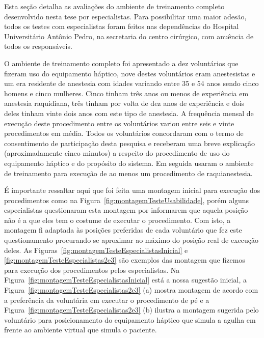Esta seção detalha as avaliações do ambiente de treinamento completo desenvolvido nesta tese por especialistas. Para possibilitar uma maior adesão, todos os testes com especialistas foram feitos nas dependências do Hospital Universitário Antônio Pedro, na secretaria do centro cirúrgico, com anuência de todos os responsáveis.

O ambiente de treinamento completo foi apresentado a dez voluntários que fizeram uso do equipamento háptico, nove destes voluntários eram anestesistas e um era residente de anestesia com idades variando entre 35 e 54 anos sendo cinco homens e cinco mulheres. Cinco tinham três anos ou menos de experiência em anestesia raquidiana, três tinham por volta de dez anos de experiência e dois deles tinham vinte dois anos com este tipo de anestesia. A frequência mensal de execução deste procedimento entre os voluntários variou entre seis e vinte procedimentos em média. Todos os voluntários concordaram com o termo de consentimento de participação desta pesquisa e receberam uma breve explicação (aproximadamente cinco minutos) a respeito do procedimento de uso do equipamento háptico e do propósito do sistema. Em seguida usaram o ambiente de treinamento para execução de ao menos um procedimento de raquianestesia. 

É importante ressaltar aqui que foi feita uma montagem inicial para execução dos procedimentos como na Figura~\ref{fig:montagemTesteUsabilidade}, porém alguns especialistas questionaram esta montagem por informarem que aquela posição não é a que eles tem o costume de executar o procedimento. Com isto, a montagem fi adaptada às posições preferidas de cada voluntário que fez este questionamento procurando se aproximar ao máximo do posição real de execução deles. As Figuras~\ref{fig:montagemTesteEspecialistasInicial} e \ref{fig:montagemTesteEspecialistas2e3} são exemplos das montagem que fizemos para execução dos procedimentos pelos especialistas. Na Figura~\ref{fig:montagemTesteEspecialistasInicial} está a nossa sugestão inicial, a Figura~\ref{fig:montagemTesteEspecialistas2e3} (a) mostra montagem de acordo com a preferência da voluntária em executar o procedimento de pé e a Figura~\ref{fig:montagemTesteEspecialistas2e3} (b) ilustra a montagem sugerida pelo voluntário para posicionamento do equipamento háptico que simula a agulha em frente ao ambiente virtual que simula o paciente.

